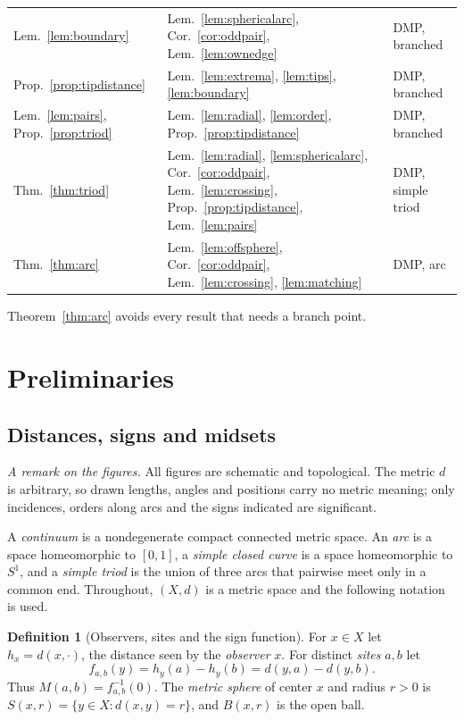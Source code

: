 \documentclass[11pt]{amsart}
\theoremstyle{definition}
\newtheorem{definition}[theorem]{Definition}
\theoremstyle{remark}
\newcommand{\M}{M}
\begin{document}
\begin{center}
\begin{tabular}{@{}p{}p{}p{}@{}}
Lem.~\ref{lem:boundary} & Lem.~\ref{lem:sphericalarc}, Cor.~\ref{cor:oddpair}, Lem.~\ref{lem:ownedge} & DMP, branched\\
Prop.~\ref{prop:tipdistance} & Lem.~\ref{lem:extrema}, \ref{lem:tips}, \ref{lem:boundary} & DMP, branched\\
Lem.~\ref{lem:pairs}, Prop.~\ref{prop:triod} & Lem.~\ref{lem:radial}, \ref{lem:order}, Prop.~\ref{prop:tipdistance} & DMP, branched\\
Thm.~\ref{thm:triod} & Lem.~\ref{lem:radial}, \ref{lem:sphericalarc}, Cor.~\ref{cor:oddpair}, Lem.~\ref{lem:crossing}, Prop.~\ref{prop:tipdistance}, Lem.~\ref{lem:pairs} & DMP, simple triod\\
Thm.~\ref{thm:arc} & Lem.~\ref{lem:offsphere}, Cor.~\ref{cor:oddpair}, Lem.~\ref{lem:crossing}, \ref{lem:matching} & DMP, arc\\
\bottomrule
\end{tabular}
\end{center}
Theorem~\ref{thm:arc} avoids every result that needs a branch point.

\section{Preliminaries}\label{sec:prelim}

\subsection{Distances, signs and midsets}
\emph{A remark on the figures.} All figures are schematic and topological. The metric $d$ is arbitrary, so drawn lengths, angles and positions carry no metric meaning; only incidences, orders along arcs and the signs indicated are significant.

A \emph{continuum} is a nondegenerate compact connected metric space. An \emph{arc} is a space homeomorphic to $[0,1]$, a \emph{simple closed curve} is a space homeomorphic to $S^1$, and a \emph{simple triod} is the union of three arcs that pairwise meet only in a common end. Throughout, $(X,d)$ is a metric space and the following notation is used.

\begin{definition}[Observers, sites and the sign function]\label{def:sign}
For $x\in X$ let $h_x=d(x,\cdot)$, the distance seen by the \emph{observer} $x$. For distinct \emph{sites} $a,b$ let
\[
f_{a,b}(y)=h_y(a)-h_y(b)=d(y,a)-d(y,b).
\]
Thus $\M(a,b)=f_{a,b}^{-1}(0)$. The \emph{metric sphere} of center $x$ and radius $r>0$ is $S(x,r)=\{y\in X:d(x,y)=r\}$, and $B(x,r)$ is the open ball.
\end{definition}
\end{document}
